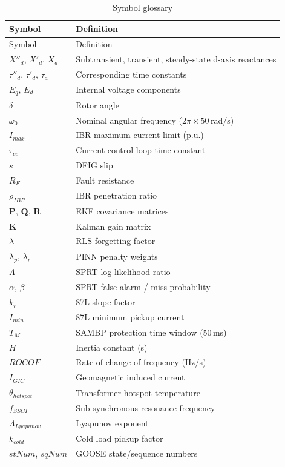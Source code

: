 \documentclass[11pt,a4paper]{report}
\newcommand{\bvec}[1]{\mathbf{#1}}
\begin{document}
\begin{longtable}{lp{8cm}}
\caption{Symbol glossary}\label{tab:symbols}\\
\toprule
Symbol & Definition \\
\midrule
\endfirsthead
\toprule Symbol & Definition \\ \midrule \endhead \bottomrule \endlastfoot
$X''_d$, $X'_d$, $X_d$ & Subtransient, transient, steady-state d-axis reactances \\
$\tau''_d$, $\tau'_d$, $\tau_a$ & Corresponding time constants \\
$E_q$, $E_d$ & Internal voltage components \\
$\delta$ & Rotor angle \\
$\omega_0$ & Nominal angular frequency ($2\pi\times 50$\,rad/s) \\
$I_{max}$ & IBR maximum current limit (p.u.) \\
$\tau_{cc}$ & Current-control loop time constant \\
$s$ & DFIG slip \\
$R_F$ & Fault resistance \\
$\rho_{IBR}$ & IBR penetration ratio \\
$\bvec{P}$, $\bvec{Q}$, $\bvec{R}$ & EKF covariance matrices \\
$\bvec{K}$ & Kalman gain matrix \\
$\lambda$ & RLS forgetting factor \\
$\lambda_p$, $\lambda_r$ & PINN penalty weights \\
$\Lambda$ & SPRT log-likelihood ratio \\
$\alpha$, $\beta$ & SPRT false alarm / miss probability \\
$k_r$ & 87L slope factor \\
$I_{min}$ & 87L minimum pickup current \\
$T_M$ & SAMBP protection time window (50\,ms) \\
$H$ & Inertia constant (s) \\
$ROCOF$ & Rate of change of frequency (Hz/s) \\
$I_{GIC}$ & Geomagnetic induced current \\
$\theta_{hotspot}$ & Transformer hotspot temperature \\
$f_{SSCI}$ & Sub-synchronous resonance frequency \\
$\Lambda_{Lyapunov}$ & Lyapunov exponent \\
$k_{cold}$ & Cold load pickup factor \\
$stNum$, $sqNum$ & GOOSE state/sequence numbers \\
\end{longtable}
\end{document}
